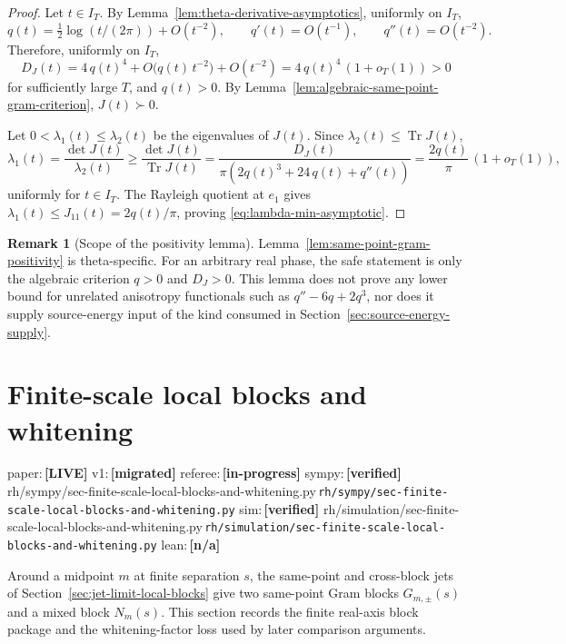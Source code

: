 \documentclass[11pt,a4paper]{amsart}
\numberwithin{equation}{section}
\theoremstyle{plain}
\theoremstyle{definition}
\newtheorem{remark}[theorem]{Remark}
\newcommand{\Tr}{\operatorname{Tr}}
\newcommand{\status}[1]{\textbf{\scriptsize[#1]}}
\newcommand{\statuspaper}[1]{\textsf{\footnotesize paper:}\,\status{#1}}
\newcommand{\statusmig}[1]{\textsf{\footnotesize v1:}\,\status{#1}}
\newcommand{\statusreferee}[1]{\textsf{\footnotesize referee:}\,\status{#1}}
\newcommand{\statussympy}[2][\relax]{%
  \textsf{\footnotesize sympy:}\,\status{#2}%
  \ifx\relax#1\else\,\textsf{\scriptsize\texttt{#1}}\fi%
}
\newcommand{\statussim}[2][\relax]{%
  \textsf{\footnotesize sim:}\,\status{#2}%
  \ifx\relax#1\else\,\textsf{\scriptsize\texttt{#1}}\fi%
}
\newcommand{\statuslean}[2][\relax]{%
  \textsf{\footnotesize lean:}\,\status{#2}%
  \ifx\relax#1\else\,\textsf{\scriptsize\texttt{#1}}\fi%
}
\begin{document}
\begin{proof}
Let \(t\in I_T\).  By Lemma~\ref{lem:theta-derivative-asymptotics},
uniformly on \(I_T\),
\[
q(t) = \tfrac12 \log(t/(2\pi)) + O(t^{-2}),\qquad
q'(t) = O(t^{-1}),\qquad q''(t) = O(t^{-2}).
\]
Therefore, uniformly on \(I_T\),
\[
D_J(t) = 4\,q(t)^4 + O\!\bigl(q(t)\,t^{-2}\bigr) + O(t^{-2})
       = 4\,q(t)^4\,(1 + o_T(1)) > 0
\]
for sufficiently large \(T\), and \(q(t)>0\).  By
Lemma~\ref{lem:algebraic-same-point-gram-criterion},
\(J(t) \succ 0\).

Let \(0 < \lambda_1(t) \le \lambda_2(t)\) be the eigenvalues of
\(J(t)\).  Since \(\lambda_2(t) \le \Tr J(t)\),
\[
\lambda_1(t) = \frac{\det J(t)}{\lambda_2(t)}
          \ge \frac{\det J(t)}{\Tr J(t)}
          = \frac{D_J(t)}{\pi(2 q(t)^3 + 24\,q(t) + q''(t))}
          = \frac{2 q(t)}{\pi}\,(1 + o_T(1)),
\]
uniformly for \(t\in I_T\).  The Rayleigh quotient at \(e_1\) gives
\(\lambda_1(t) \le J_{11}(t) = 2 q(t)/\pi\), proving
\eqref{eq:lambda-min-asymptotic}.
\end{proof}

\begin{remark}[Scope of the positivity lemma]
\label{rem:scope-of-gram-positivity}
Lemma~\ref{lem:same-point-gram-positivity} is theta-specific.  For an
arbitrary real phase, the safe statement is only the algebraic
criterion \(q > 0\) and \(D_J > 0\).  This lemma does not prove any
lower bound for unrelated anisotropy functionals such as
\(q'' - 6q + 2q^3\), nor does it supply source-energy input of the
kind consumed in Section~\ref{sec:source-energy-supply}.
\end{remark}

\section{Finite-scale local blocks and whitening}
\label{sec:finite-scale-local-blocks-and-whitening}
\statuspaper{LIVE}\quad
\statusmig{migrated}\quad
\statusreferee{in-progress}\quad
\statussympy[rh/sympy/sec-finite-scale-local-blocks-and-whitening.py]{verified}\quad
\statussim[rh/simulation/sec-finite-scale-local-blocks-and-whitening.py]{verified}\quad
\statuslean{n/a}
\par\medskip

Around a midpoint \(m\) at finite separation \(s\), the same-point and
cross-block jets of Section~\ref{sec:jet-limit-local-blocks} give two
same-point Gram blocks \(G_{m,\pm}(s)\) and a mixed block \(N_m(s)\).
This section records the finite real-axis block package and the
whitening-factor loss used by later comparison arguments.
\end{document}

